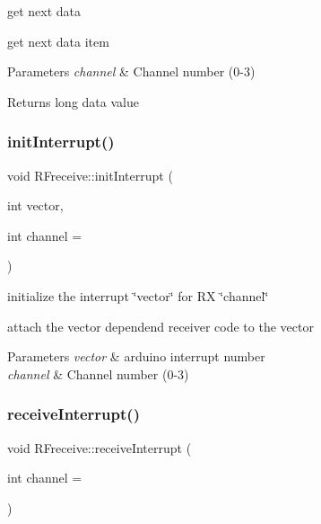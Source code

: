 get next data 

get next data item 
\begin{DoxyParams}{Parameters}
{\em channel} & Channel number (0-\/3) \\
\hline
\end{DoxyParams}
\begin{DoxyReturn}{Returns}
long data value 
\end{DoxyReturn}
\mbox{\label{class_r_freceive_a1449b9fc5ca1c08869eadd3990d9236c}} 
\subsubsection{\texorpdfstring{init\+Interrupt()}{initInterrupt()}}
{\footnotesize\ttfamily void R\+Freceive\+::init\+Interrupt (\begin{DoxyParamCaption}\item[{int}]{vector,  }\item[{int}]{channel = {} }\end{DoxyParamCaption})}



initialize the interrupt \char`\"{}vector\char`\"{} for RX \char`\"{}channel\char`\"{} 

attach the vector dependend receiver code to the vector


\begin{DoxyParams}{Parameters}
{\em vector} & arduino interrupt number ~\newline
\\
\hline
{\em channel} & Channel number (0-\/3) \\
\hline
\end{DoxyParams}
\mbox{\label{class_r_freceive_accecae78a1b37c6374ef287f2169aa65}} 
\subsubsection{\texorpdfstring{receive\+Interrupt()}{receiveInterrupt()}}
{\footnotesize\ttfamily void R\+Freceive\+::receive\+Interrupt (\begin{DoxyParamCaption}\item[{int}]{channel = {} }\end{DoxyParamCaption})\hspace{0.3cm}{\ttfamily [static]}}



